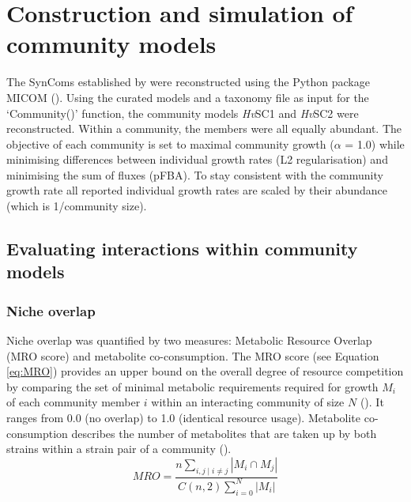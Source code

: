 \section{Construction and simulation of community models} \label{sec:Construction and simulation of community models}
The SynComs established by \cite{mahdi_low_2026} were reconstructed using the Python package MICOM (\cite{diener_micom_2020}). Using the curated models and a taxonomy file as input for the ‘Community()’ function, the community models \textit{Hv}SC1 and \textit{Hv}SC2 were reconstructed. Within a community, the members were all equally abundant.
The objective of each community is set to maximal community growth ($\alpha$ = 1.0) while minimising differences between individual growth rates (L2 regularisation) and minimising the sum of fluxes (pFBA). To stay consistent with the community growth rate all reported individual growth rates are scaled by their abundance (which is 1/community size). 
\subsection{Evaluating interactions within community models}
\subsubsection{Niche overlap}
Niche overlap was quantified by two measures: Metabolic Resource Overlap (MRO score) and metabolite co-consumption. The MRO score (see Equation \ref{eq:MRO}) provides an upper bound on the overall degree of resource competition by comparing the set of minimal metabolic requirements required for growth $M_i$ of each community member $i$ within an interacting community of size $N$ (\cite{zelezniak_metabolic_2015}). It ranges from 0.0 (no overlap) to 1.0 (identical resource usage). Metabolite co-consumption describes the number of metabolites that are taken up by both strains within a strain pair of a community (\cite{diener_micom_2020}).
\begin{equation}
	MRO = \frac{n \displaystyle\sum_{i, j \mid i \neq j} |M_i \cap M_j|}{C(n, 2) \displaystyle\sum_{i=0}^{N} |M_i|}
	\label{eq:MRO}
\end{equation}
